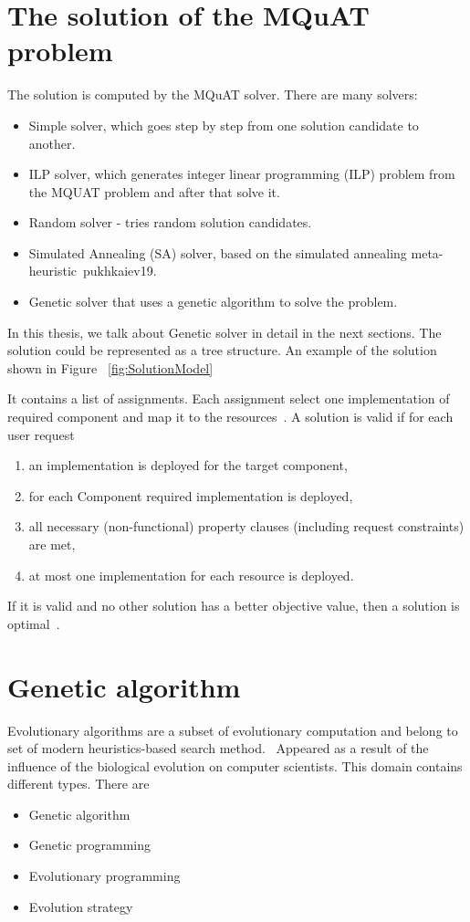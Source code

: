 
\section{The solution of the MQuAT problem}
The solution is computed by the MQuAT solver. There are many solvers:
\begin{itemize}
	\item Simple solver, which goes step by step from one solution candidate to another.
	\item ILP solver, which generates integer linear programming (ILP) problem from the MQUAT problem and after that solve it.
	\item Random solver - tries random solution candidates.
	\item Simulated Annealing (SA) solver, based on the simulated annealing meta-heuristic~{pukhkaiev19}.
	\item Genetic solver that uses a genetic algorithm to solve the problem.
\end{itemize}
In this thesis, we talk about Genetic solver in detail in the next sections.
The solution could be represented as a tree structure. An example of the solution shown in Figure ~\ref{fig:SolutionModel}

It contains a list of assignments. Each assignment select one implementation of required component and map it to the resources~\cite{gotz18}.
A solution is valid if for each user request
\begin{enumerate}
	\item an implementation is deployed for the target component,
	\item for each Component required implementation is deployed,
	\item all necessary (non-functional) property clauses (including request constraints) are met,
	\item at most one implementation for each resource is deployed.
\end{enumerate}
If it is valid and no other solution has a better objective value, then a solution is optimal~\cite{gotz18}.

\section{Genetic algorithm}
\label{sec:GeneticAlgorithm}
Evolutionary algorithms are a subset of evolutionary computation and belong to set of modern heuristics-based search method.~\cite{vikhar16}
Appeared as a result of the influence of the biological evolution on computer scientists. This domain contains different types.
There are
\begin{itemize}
	\item Genetic algorithm 
	\item Genetic programming
	\item Evolutionary programming
	\item Evolution strategy
\end{itemize}

